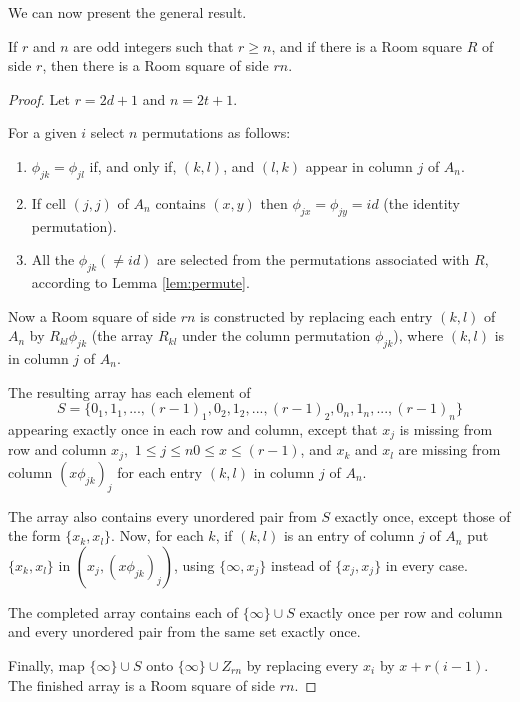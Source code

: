 We can now present the general result.

\begin{theorem}
\label{thm:wallis}
If $r$ and $n$ are odd integers such that $r \geq n$, and if there is a Room square $R$ of side $r$, then there is a Room square of side $rn$.
\end{theorem}

\begin{proof}
Let $r = 2d + 1$ and $n = 2t + 1$.

For a given $i$ select $n$ permutations as follows:

\begin{enumerate}
  \item{$\phi _{jk} = \phi _{jl}$ if, and only if, $(k, l)$, and $(l, k)$ appear in column $j$ of $A_n$.}
  \item{If cell $(j, j)$ of $A_n$ contains $(x, y)$ then $\phi _{jx} = \phi _{jy} = id$ (the identity permutation).}
  \item{All the $\phi _{jk} (\neq id)$ are selected from the permutations associated with $R$, according to Lemma \ref{lem:permute}.}
\end{enumerate}

Now a Room square of side $rn$ is constructed by replacing each entry $(k, l)$ of $A_n$ by $R_{kl} \phi _{jk}$ (the array $R_{kl}$ under the column permutation $\phi _{jk}$), where $(k, l)$ is in column $j$ of $A_n$.

The resulting array has each element of
\begin{equation}
S = \{0_1,1_1,...,(r-1)_1,0_2,1_2,...,(r-1)_2,0_n,1_n,...,(r-1)_n\}
\end{equation}
appearing exactly once in each row and column, except that $x_j$ is missing from row and column
$x_j,$ $1 \leq j \leq n 0 \leq x \leq (r-1)$, and $x_k$ and $x_l$ are missing from column $(x \phi _{jk})_j$ for each entry $(k,l)$ in column $j$ of $A_n$.

The array also contains every unordered pair from $S$ exactly once, except those of the form $\{x_k,x_l\}$.
Now, for each $k$, if $(k, l)$ is an entry of column $j$ of $A_n$ put $\{x_k, x_l\}$ in $(x_j, (x \phi _{jk})_j)$, using $\{\infty, x_j\}$ instead of $\{x_j, x_j\}$ in every case.

The completed array contains each of $\{\infty\} \cup S$ exactly once per row and column and every unordered pair from the same set exactly once.

Finally, map $\{\infty\} \cup S$ onto $\{\infty \} \cup Z_{rn}$ by replacing every $x_i$ by $x + r(i - 1)$.
The finished array is a Room square of side $rn$.
\end{proof}

